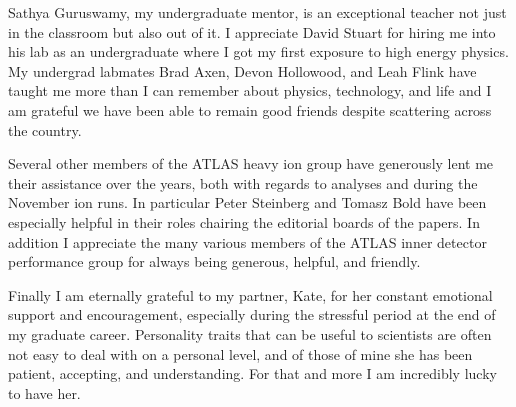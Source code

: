 Sathya Guruswamy, my undergraduate mentor, is an exceptional teacher not just in the classroom but also out of it.
I appreciate David Stuart for hiring me into his lab as an undergraduate where I got my first exposure to high energy physics.
My undergrad labmates Brad Axen, Devon Hollowood, and Leah Flink have taught me more than I can remember about physics, technology, and life and I am grateful we have been able to remain good friends despite scattering across the country.

Several other members of the ATLAS heavy ion group have generously lent me their assistance over the years, both with regards to analyses and during the November ion runs.
In particular Peter Steinberg and Tomasz Bold have been especially helpful in their roles chairing the editorial boards of the papers.
In addition I appreciate the many various members of the ATLAS inner detector performance group for always being generous, helpful, and friendly.

Finally I am eternally grateful to my partner, Kate, for her constant emotional support and encouragement, especially during the stressful period at the end of my graduate career.
Personality traits that can be useful to scientists are often not easy to deal with on a personal level, and of those of mine she has been patient, accepting, and understanding.
For that and more I am incredibly lucky to have her.
